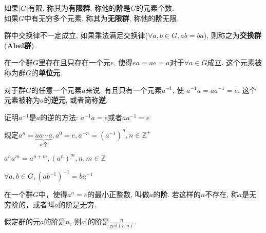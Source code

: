 \begin{Definition}[群的阶]
如果$|G|$有限, 称其为\textbf{有限群}, 称他的\textbf{阶}是$G$的元素个数. \\
如果$G$中有无穷多个元素, 称其为\textbf{无限群}, 称他的\textbf{阶}无限.
\end{Definition}

\begin{Definition}
群中交换律不一定成立, 如果乘法满足交换律($\forall a, b \in G, ab = ba$), 则称之为\textbf{交换群}(\textbf{Abel群}).
\end{Definition}

\begin{Theorem}[单位元]
在一个群$G$里存在且只存在一个元$e$, 使得$ea = ae = a$对于$\forall a \in G$成立. 这个元素被称为群$G$的\textbf{单位元}.
\end{Theorem}

\begin{Theorem}[逆元]
对于群$G$的任意一个元素$a$来说, 有且只有一个元素$a^{-1}$, 
使 $a^{-1} a = a a^{-1} = e$. 这个元素被称为$a$的\textbf{逆元}, 或者简称\textbf{逆}.
\end{Theorem}

\begin{Note}
证明$a^{-1}$是$a$的逆的方法: $a^{-1}a = e$或者$aa^{-1} = e$
\end{Note}

\begin{Definition}
规定$a^n = \underbrace{a a \cdots a}_{n\text{个}}, a^0 = e, a^{-n} = (a^{-1})^n, n \in \mathbb{Z}^{+}$
\end{Definition}

\begin{Theorem}
$ a^n a^m = a^{n+m}, (a^n)^m, n, m \in \mathbb{Z} $ 
\end{Theorem}

\begin{Proposition}[乘积的逆等于逆的乘积]
$\forall a, b \in G, {(ab^{-1})}^{-1} = b a^{-1}$
\end{Proposition}

\begin{Definition}[元素的阶]
在一个群$G$中，使得$a^n = e$的最小正整数, 叫做$a$的\textbf{阶}. 若这样的$n$不存在, 称$a$是无穷阶的，或者叫$a$的阶是无穷.
\end{Definition}

\begin{Theorem}
假定群的元$a$的阶是$n$, 则$a^r$的阶是$\displaystyle \frac{n}{\text{gcd}(r, n)}$.
\end{Theorem}


